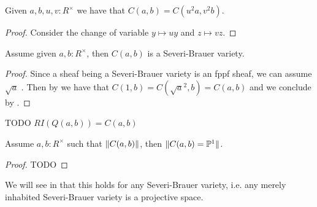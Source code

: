 \begin{lemma}\label{conic-change-variable}
Given $a,b,u,v:R^\times$ we have that $C(a,b) = C(u^2a,v^2b)$.
\end{lemma}

\begin{proof}
Consider the change of variable $y\mapsto uy$ and $z\mapsto vz$.
\end{proof}

\begin{lemma}
Assume given $a,b:R^\times$, then $C(a,b)$ is a Severi-Brauer variety.
\end{lemma}

\begin{proof}
Since a sheaf being a Severi-Brauer variety is an fppf sheaf, we can assume $\sqrt{a}$ . Then by  we have that $C(1,b) = C(\sqrt{a}^2,b)=C(a,b)$ and we conclude by .
\end{proof}

TODO $RI(Q(a,b)) = C(a,b)$

\begin{lemma}
Assume $a,b:R^\times$ such that $\lVert C(a,b) \rVert$, then $\lVert C(a,b)=\mathbb{P}^1 \rVert$.
\end{lemma}

\begin{proof}
TODO
\end{proof}

\begin{remark}
We will see in  that this holds for any Severi-Brauer variety, i.e. any merely inhabited Severi-Brauer variety is a projective space. 
\end{remark}